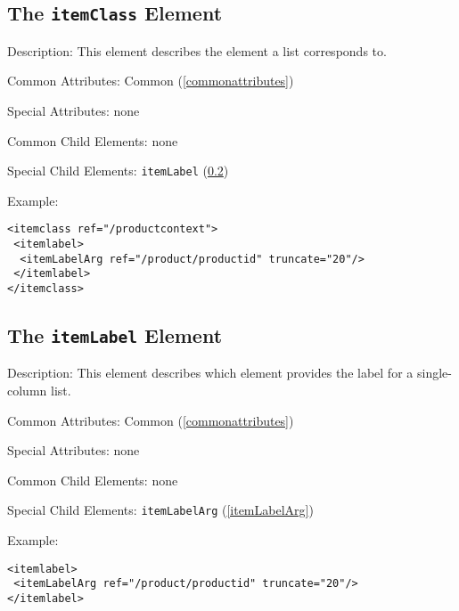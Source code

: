\subsection{ The \texttt{itemClass} Element}
\label{itemClass}
\begin{description}
 \item Description: This element describes the element a list corresponds to.

 \item Common Attributes: Common (\ref{commonattributes})

 \item Special Attributes: none

 \item Common Child Elements: none

 \item Special Child Elements: \texttt{itemLabel} (\ref{itemLabel})

 \item Example: 

\begin{lstlisting}[caption=\texttt{itemClass} Element]
<itemclass ref="/productcontext">
 <itemlabel>
  <itemLabelArg ref="/product/productid" truncate="20"/>
 </itemlabel>
</itemclass>
\end{lstlisting}
\end{description}





\subsection{ The \texttt{itemLabel} Element}
\label{itemLabel}
\begin{description}
 \item Description: This element describes which element provides the label for a single-column list.

 \item Common Attributes: Common (\ref{commonattributes})

 \item Special Attributes: none

 \item Common Child Elements: none

 \item Special Child Elements: \texttt{itemLabelArg} (\ref{itemLabelArg})

 \item Example: 

\begin{lstlisting}[caption=\texttt{itemLabel} Element]
<itemlabel>
 <itemLabelArg ref="/product/productid" truncate="20"/>
</itemlabel>
\end{lstlisting}
\end{description}





